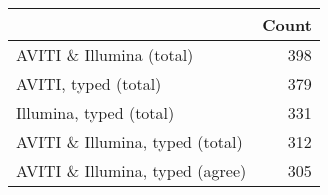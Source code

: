 \begin{tabular}{lr}
\toprule
 & Count \\
\midrule
AVITI \& Illumina (total) & 398 \\
AVITI, typed (total) & 379 \\
Illumina, typed (total) & 331 \\
AVITI \& Illumina, typed (total) & 312 \\
AVITI \& Illumina, typed (agree) & 305 \\
\bottomrule
\end{tabular}
